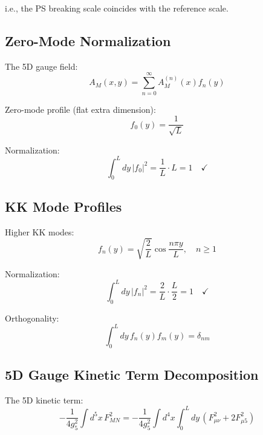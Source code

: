 \documentclass[11pt,a4paper]{article}
\theoremstyle{definition}
\begin{document}
i.e., the PS breaking scale coincides with the reference scale.

\subsection{Zero-Mode Normalization}
\label{subsec:zero-mode}

The 5D gauge field:
\begin{equation}
\label{eq:5d-gauge}
A_M(x,y) = \sum_{n=0}^{\infty} A_M^{(n)}(x) f_n(y)
\end{equation}

Zero-mode profile (flat extra dimension):
\begin{equation}
\label{eq:zero-mode-profile}
f_0(y) = \frac{1}{\sqrt{L}}
\end{equation}

Normalization:
\begin{equation}
\label{eq:zero-mode-norm}
\int_0^L dy \, |f_0|^2 = \frac{1}{L} \cdot L = 1 \quad \checkmark
\end{equation}

\subsection{KK Mode Profiles}
\label{subsec:kk-profiles}

Higher KK modes:
\begin{equation}
\label{eq:kk-profile}
f_n(y) = \sqrt{\frac{2}{L}} \cos\frac{n\pi y}{L}, \quad n \geq 1
\end{equation}

Normalization:
\begin{equation}
\label{eq:kk-norm}
\int_0^L dy \, |f_n|^2 = \frac{2}{L} \cdot \frac{L}{2} = 1 \quad \checkmark
\end{equation}

Orthogonality:
\begin{equation}
\label{eq:kk-orthog}
\int_0^L dy \, f_n(y) f_m(y) = \delta_{nm}
\end{equation}

\subsection{5D Gauge Kinetic Term Decomposition}
\label{subsec:5d-decomposition}

The 5D kinetic term:
\begin{equation}
\label{eq:5d-kinetic-full}
-\frac{1}{4g_5^2} \int d^5x \, F_{MN}^2 =
  -\frac{1}{4g_5^2} \int d^4x \int_0^L dy \, \left(F_{\mu\nu}^2 + 2 F_{\mu 5}^2\right)
\end{equation}
\end{document}
